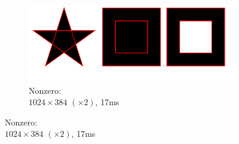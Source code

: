 \documentclass[UTF8]{ctexart}
\begin{document}
\begin{figure}[H]
    \begin{subfigure}[b]{0.45\textwidth}
        \centering
        \includegraphics[width=\textwidth]{images/Nonzero-1024x384-x2-17ms.png}
        \caption{Nonzero: \\$1024 \times 384$ $(\times 2)$, 17ms}
    \end{subfigure}
\end{figure}
\end{document}
